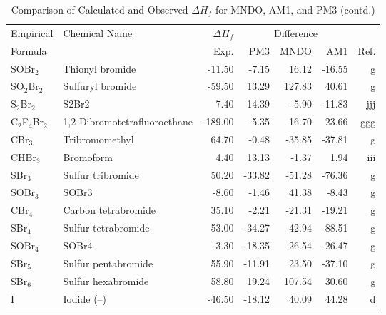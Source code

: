 \begin{table}
\caption{Comparison of Calculated and Observed $\Delta H_f$ 
for MNDO, AM1, and PM3 (contd.)}
\begin{center}
\compresstable
\begin{tabular}{llrrrrr}
Empirical & Chemical Name & $\Delta H_f$ & \multicolumn{3}{c}{Difference} & \\
Formula   &               & Exp. & PM3 &  MNDO  &  AM1 &     Ref.\\
\hline
 SOBr$_2$       & Thionyl bromide                 &   -11.50    &    -7.15  &    16.12  &   -16.55  &      g\\
 SO$_2$Br$_2$      & Sulfuryl bromide                &   -59.50    &    13.29  &   127.83  &    40.61  &      g\\
 S$_2$Br$_2$       & S2Br2                           &     7.40    &    14.39  &    -5.90  &   -11.83  &    jjj\\
 C$_2$F$_4$Br$_2$     & 1,2-Dibromotetrafluoroethane    &  -189.00    &    -5.35  &    16.70  &    23.66  &    ggg\\
 CBr$_3$        & Tribromomethyl                  &    64.70    &    -0.48  &   -35.85  &   -37.81  &      g\\
 CHBr$_3$       & Bromoform                       &     4.40    &    13.13  &    -1.37  &     1.94  &    iii\\
 SBr$_3$        & Sulfur tribromide               &    50.20    &   -33.82  &   -51.28  &   -76.36  &      g\\
 SOBr$_3$       & SOBr3                           &    -8.60    &    -1.46  &    41.38  &    -8.43  &      g\\
 CBr$_4$        & Carbon tetrabromide             &    35.10    &    -2.21  &   -21.31  &   -19.21  &      g\\
 SBr$_4$        & Sulfur tetrabromide             &    53.00    &   -34.27  &   -42.94  &   -88.51  &      g\\
 SOBr$_4$       & SOBr4                           &    -3.30    &   -18.35  &    26.54  &   -26.47  &      g\\
 SBr$_5$        & Sulfur pentabromide             &    55.90    &   -11.91  &    23.50  &   -37.10  &      g\\
 SBr$_6$        & Sulfur hexabromide              &    58.80    &    19.24  &   107.54  &    30.60  &      g\\
 I           & Iodide (--)                      &   -46.50    &   -18.12  &    40.09  &    44.28  &      d\\

\end{tabular}
\end{center}
\end{table}
